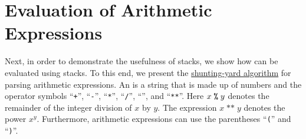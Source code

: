 \section{Evaluation of Arithmetic Expressions}
Next, in order to demonstrate the usefulness of stacks, we show how  can be
evaluated using stacks.  To this end, we present the
\href{https://en.wikipedia.org/wiki/Shunting-yard_algorithm}{shunting-yard algorithm} for
parsing arithmetic expressions.  
An  is a string that is made up of numbers and
the operator symbols ``\texttt{+}'', ``\texttt{-}'', ``\texttt{*}'', ``\texttt{/}'',
``\texttt{}'', and ``\texttt{**}''. Here $x \;\texttt{\symbol{37}}\; y$ denotes the
remainder of the integer division of $x$ by $y$.  The expression $x\;\texttt{**}\;y$ denotes the power $x^y$.
Furthermore, arithmetic expressions can use the parentheses ``\texttt{(}'' and ``\texttt{)}''.
  

